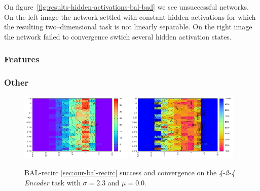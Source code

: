 On figure~\ref{fig:results-hidden-activations-bal-bad} we see unsuccessful networks. On the left image the network settled with constant hidden activations for which the resulting two--dimensional task is not linearly separable. On the right image the network failed to convergence swtich several hidden activation states.

\subsubsection{Features}



\subsubsection{Other} 

\begin{figure}[H]
  \centering
  \includegraphics[width=0.48\textwidth]{img/bal-recirc-auto4-success.pdf}   
  \includegraphics[width=0.48\textwidth]{img/bal-recirc-auto4-epoch.pdf}     
  \caption{BAL-recirc \ref{sec:our-bal-recirc} success and convergence on the \emph{4-2-4 Encoder} task with $\sigma = 2.3$ and $\mu = 0.0$.}
  \label{fig:results-bal-recirc-auto4-performance}
\end{figure}


